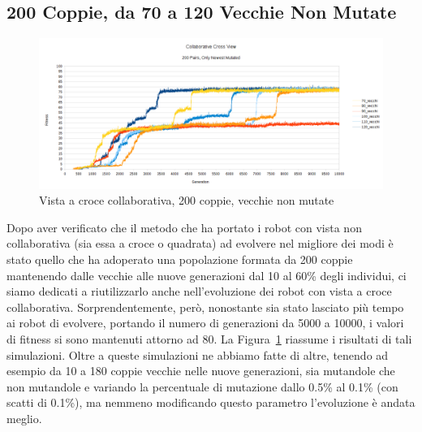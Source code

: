 \subsection{200 Coppie, da 70 a 120 Vecchie Non Mutate}
\begin{figure}[ht]
	\centering
	\includegraphics[scale=0.7,angle=90]{imgs/cross_c_200_pairs_70_120_old_not_mutated.png}
	\caption{Vista a croce collaborativa, 200 coppie, vecchie non mutate}
	\label{figure:cross_c_200_70_120_non}
\end{figure}
Dopo aver verificato che il metodo che ha portato i robot con vista non
collaborativa (sia essa a croce o quadrata) ad evolvere nel migliore dei modi 
è stato quello che ha adoperato una popolazione formata da 200 coppie mantenendo
dalle vecchie alle nuove generazioni dal 10 al 60\% degli individui, ci siamo
dedicati a riutilizzarlo anche nell'evoluzione dei robot con vista a croce
collaborativa.\newline
Sorprendentemente, però, nonostante sia stato lasciato più tempo ai robot di
evolvere, portando il numero di generazioni da 5000 a 10000, i valori di fitness
si sono mantenuti attorno ad 80. La Figura~\ref{figure:cross_c_200_70_120_non}
riassume i risultati di tali simulazioni.\newline
Oltre a queste simulazioni ne abbiamo fatte di altre, tenendo ad esempio da 10
a 180 coppie vecchie nelle nuove generazioni, sia mutandole che non mutandole e
variando la percentuale di mutazione dallo 0.5\% al 0.1\% (con scatti di 0.1\%),
ma nemmeno modificando questo parametro l'evoluzione è andata meglio.



\clearpage



